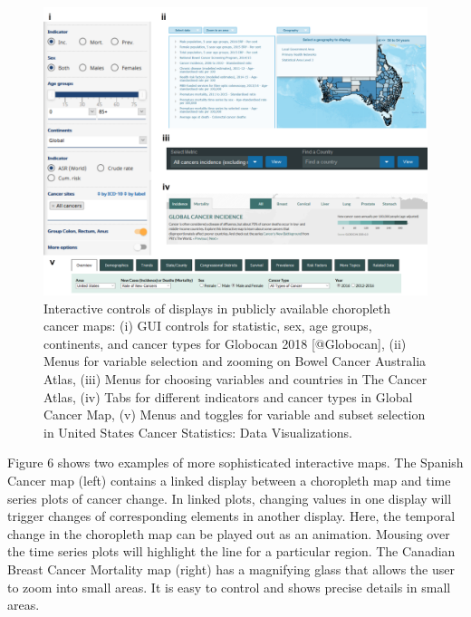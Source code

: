 \documentclass{monashthesis}
\begin{document}
\begin{figure}

{\centering \includegraphics[width=1\linewidth]{figures/02-literature/interacting} 

}

\caption{ Interactive controls of displays in publicly available choropleth cancer maps: (i) GUI controls for statistic, sex, age groups, continents, and cancer types for Globocan 2018 [@Globocan], (ii) Menus for variable selection and zooming on Bowel Cancer Australia Atlas, (iii) Menus for choosing variables and countries in The Cancer Atlas, (iv) Tabs for different indicators and cancer types in Global Cancer Map, (v) Menus and toggles for variable and subset selection in United States Cancer Statistics: Data Visualizations.}\label{fig:interacting}
\end{figure}

Figure 6 shows two examples of more sophisticated interactive maps. The Spanish Cancer map (left) contains a linked display between a choropleth map and time series plots of cancer change. In linked plots, changing values in one display will trigger changes of corresponding elements in another display. Here, the temporal change in the choropleth map can be played out as an animation. Mousing over the time series plots will highlight the line for a particular region. The Canadian Breast Cancer Mortality map (right) has a magnifying glass that allows the user to zoom into small areas. It is easy to control and shows precise details in small areas.
\end{document}
